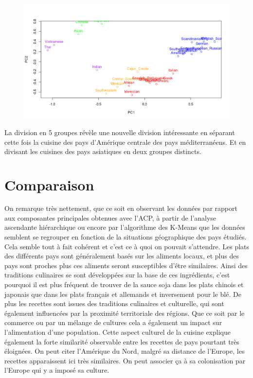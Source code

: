 \documentclass[a4paper, titlepage]{report}
\begin{document}
\begin{figure}[h]
	\begin{center}
		\includegraphics[scale = 0.32]{./doc/plot-kmeans-5.png}
	\end{center}
\end{figure}

La division en 5 groupes révèle une nouvelle division intéressante en séparant cette fois la cuisine des pays d’Amérique centrale des pays méditerranéens. Et en divisant les cuisines des pays asiatiques en deux groupes distincts.


\section{Comparaison}

On remarque très nettement, que ce soit en observant les données par rapport aux composantes principales obtenues avec l'ACP, à partir de l'analyse ascendante hiérarchique ou encore par l'algorithme des K-Means que les données semblent se regrouper en fonction de la situations géographique des pays étudiés. Cela semble tout à fait cohérent et c'est ce à quoi on pouvait s'attendre.
Les plats des différents pays sont généralement basés sur les aliments locaux, et plus des pays sont proches plus ces aliments seront susceptibles d'être similaires. Ainsi des traditions culinaires se sont développées sur la base de ces ingrédients, c'est pourquoi il est plus fréquent de trouver de la sauce soja dans les plats chinois et japonais que dans les plats français et allemands et inversement pour le blé.
De plus les recettes sont issues des traditions culinaires et culturelle, qui sont également influencées par la proximité territoriale des régions. Que ce soit par le commerce ou par un mélange de cultures cela a également un impact sur l'alimentation d'une population. Cette aspect culturel de la cuisine explique également la forte similarité observable entre les recettes de pays pourtant très éloignées. On peut citer l'Amérique du Nord, malgré sa distance de l'Europe, les recettes apparaissent ici très similaires. On peut associer ça à sa colonisation par l'Europe qui y a imposé sa culture.
\end{document}
